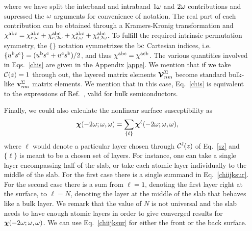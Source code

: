 \documentclass[floatfix,prb,aps,superscriptaddress,showpacs,11pt,preprint,letterpaper]{revtex4}
\def\chon{red}
\begin{document}
where we have split the interband and intraband $1\omega$ and $2\omega$
contributions and supressed the $\omega$ arguments for 
convenience of notation.
The real part of each contribution can be obtained through
a Kramers-Kronig transformation\cite{nicolasPRB14} and
$\chi^{\mathrm{a}\mathrm{b}\mathrm{c}}=
\chi^{\mathrm{a}\mathrm{b}\mathrm{c}}_{e,\omega} 
+\chi^{\mathrm{a}\mathrm{b}\mathrm{c}}_{e,2\omega}
+\chi^{\mathrm{a}\mathrm{b}\mathrm{c}}_{i,\omega} 
+\chi^{\mathrm{a}\mathrm{b}\mathrm{c}}_{i,2\omega}
$.
To fulfill the required intrinsic permutation symmetry, %
the $\{\}$ notation symmetrizes the $\mathrm{b}\mathrm{c}$ Cartesian indices, i.e. 
$\{u^{\mathrm{b}}s^{\mathrm{c}}\}=(u^{\mathrm{b}}s^{\mathrm{c}}+u^{\mathrm{c}}s^{\mathrm{b}})/2$,
and thus
$\chi^{\mathrm{a}\mathrm{b}\mathrm{c}}=\chi^{\mathrm{a}\mathrm{c}\mathrm{b}}$.
The various quantities involved in Eqs.~\eqref{chis} are given in
the Appendix \ref{appe}. 
We mention that if we take ${\mathbf{\cal C}}(z)=1$ through out, the layered
matrix elements $\boldsymbol{\mathcal{\cal V}}^{\Sigma}_{nm}$ become standard bulk-like
$\mathbf{v}^{\Sigma}_{nm}$ matrix elements. We mention that in this
case, Eq.~\eqref{chis} is equivalent to the expressions of
Ref.~, valid for bulk semiconductors.
 
Finally, we could also calculate the nonlinear surface susceptibility as 
\begin{equation}\label{chiijksur}
\boldsymbol{\chi}(-2\omega;\omega,\omega)
= \sum_{\{\ell\}}\boldsymbol{\chi}^\ell(-2\omega;\omega,\omega),
\end{equation} 
where $\ell$ would denote a particular layer chosen through
${\mathbf{\cal C}}^\ell(z)$ of Eq.~\eqref{sz} and
$\{\ell\}$
is meant to be a chosen set of layers. For instance, 
one can take a single layer 
encompassing half of the slab, or take each 
atomic layer individually to the middle
of the slab. For the first case there is 
a single summand
in Eq.~\eqref{chiijksur}. For the second case
there is a sum from $\ell=1$, denoting the first layer 
right at the surface, to $\ell=N$, denoting the layer at the middle of the slab 
that behaves like a bulk layer.
We remark that the value of 
$N$ is not universal and
the slab needs to have enough atomic layers 
in order to give converged results for 
$\boldsymbol{\chi} (-2\omega;\omega,\omega)$. 
We can use Eq.~\eqref{chiijksur} for 
either the front or the back surface. 
\cite{mejiaRMF04}
\end{document}
